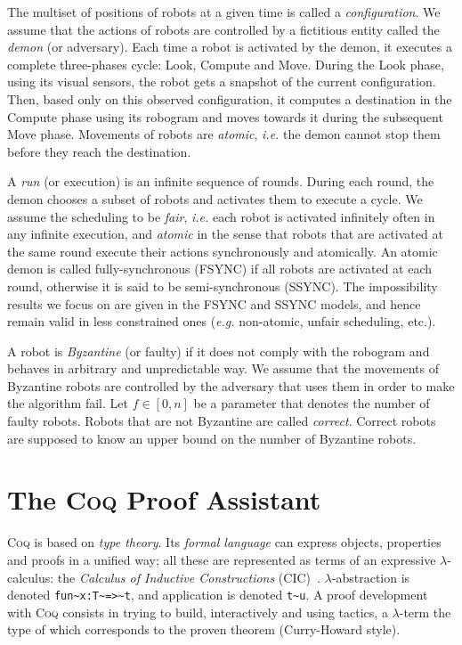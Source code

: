\documentclass[11pt,a4]{llncs}
\newcommand{\x}{\xspace}
\newcommand{\coq}{\textsc{Coq}\x}
\begin{document}
The multiset of positions of robots at a given time is called a
\emph{configuration}.
We assume that the actions of robots are controlled by a fictitious entity called the \emph{demon} (or adversary).
Each time a robot is activated by the demon, it executes a complete three-phases cycle: 
Look, Compute and Move.
During the Look phase, using its visual sensors, the robot gets a snapshot of the current configuration. 
Then, based only on this observed configuration, it computes a destination in the Compute phase using its robogram
and moves towards it during the subsequent Move phase.
Movements of robots are \emph{atomic}, \emph{i.e.} the demon cannot stop them before they reach the destination.


A \emph{run} (or execution) is an infinite sequence of rounds. 
During each round, the demon chooses a subset of robots and activates them to execute a cycle.
We assume the scheduling to be \emph{fair}, \emph{i.e.} each robot is
activated infinitely often in any infinite execution, 
and \emph{atomic} in the sense that robots that
are activated at the same round execute their actions synchronously and atomically.
An atomic demon is called fully-synchronous (FSYNC) if all robots are activated at each round, 
otherwise it is said to be semi-synchronous (SSYNC).
The impossibility results we focus on are given in the FSYNC and SSYNC
models, and hence remain valid in less constrained ones (\emph{e.g.}
non-atomic, unfair scheduling, etc.).

A robot is \emph{Byzantine} (or faulty) if it does not comply with the robogram
and behaves in arbitrary and unpredictable way.
We assume that the movements of Byzantine robots are controlled by the adversary 
that uses them in order to make the algorithm fail.
Let $f \in [0,n]$ be a parameter that denotes the number of faulty robots.
Robots that are not Byzantine are called \emph{correct}. Correct
robots are supposed to know an upper bound on the number of Byzantine
robots. 

\section{The \coq Proof Assistant}
\label{sec:proof-assistant}

\coq{} is based on \emph{type theory}.
Its  \emph{formal language} can express objects, properties
and proofs in a unified way; all these are represented as terms of an
expressive $\lambda$-calculus: the \emph{Calculus of Inductive
  Constructions} (CIC)~\cite{coquand90colog}. $\lambda$-abstraction is
denoted \lstinline!fun~x:T~=>~t!, and application is denoted
\lstinline!t~u!.  A proof development with \coq{} consists in trying to
build, interactively and using tactics, a $\lambda$-term the type of
which corresponds to the proven theorem (Curry-Howard style).
\end{document}
